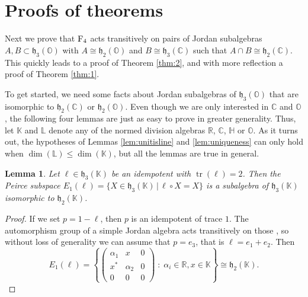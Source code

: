 \documentclass{article}
\theoremstyle{plain}
\newtheorem{lem}[thm]{Lemma}
\theoremstyle{remark}
\theoremstyle{definition}
\newcommand{\tr}{\operatorname{tr}}
\newcommand{\R}{{\mathbb R}}  %
\newcommand{\C}{{\mathbb C}}  %
\renewcommand{\H}{{\mathbb H}}  %
\renewcommand{\O}{{\mathbb O}}  %
\newcommand{\K}{{\mathbb K}}   %
\renewcommand{\L}{{\mathbb L}}   %
\newcommand{\F}{{\rm F}}       %
\newcommand{\h}{\mathfrak{h}}  %
\begin{document}
\section{Proofs of theorems}
\label{sec:proofs}

Next we prove that $\F_4$ acts transitively on pairs of Jordan subalgebras $A,B \subset \h_3(\O)$ with $A \cong \h_2(\O)$ and $B \cong \h_3(\C)$ such that $A \cap B \cong \h_2(\C)$.  This quickly leads to a proof of Theorem \ref{thm:2}, and with more reflection a proof of Theorem \ref{thm:1}.  

To get started, we need some facts about Jordan subalgebras of $\h_3(\O)$ that are isomorphic to $\h_2(\C)$ or $\h_2(\O)$.  Even though we are only interested in $\C$ and $\O$, the following four lemmas are just as easy to prove in greater generality.  Thus, let $\K$ and $\L$ denote any of the normed division algebras $\R$, $\C$, $\H$ or $\O$.  As it turns out, the hypotheses of Lemmas \ref{lem:unitisline} and \ref{lem:uniqueness} can only hold when $\dim(\L) \le \dim(\K)$, but all the lemmas are true in general.

\begin{lem}
\label{lem:E1subalgebra}
Let $\ell\in\h_3(\K)$ be an idempotent with $\tr(\ell)=2$. Then the Peirce subspace $E_1(\ell) = \{X\in\h_3(\K)\,|\,\ell \circ X= X\}$ is a subalgebra of $\h_3(\K)$ isomorphic to $\h_2(\K)$.
\end{lem}
\begin{proof}
If we set $p=1-\ell$, then $p$ is an idempotent of trace $1$. The automorphism group of a simple Jordan algebra acts transitively on those \cite[Cor.~IV.2.4]{FarautKoranyi}, so without loss of generality we can assume that $p=e_3$, that is $\ell=e_1+e_2$. Then
\[E_1(\ell) = \left\{\begin{pmatrix}
    \alpha_1 & x &0 \\
    x^\ast & \alpha_2 & 0 \\
    0 & 0 & 0 \end{pmatrix} \; \colon \; \alpha_i\in\R, x\in \K \right\} \cong \h_2(\K).\]
\end{proof}
\end{document}
